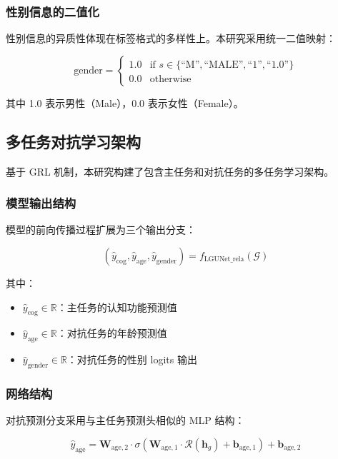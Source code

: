 \documentclass[UTF8, a4paper, 12pt]{article}
\begin{document}
\subsubsection{性别信息的二值化}

性别信息的异质性体现在标签格式的多样性上。本研究采用统一二值映射：

\begin{equation}
\text{gender} = \begin{cases}
1.0 & \text{if } s \in \{ \text{``M''}, \text{``MALE''}, \text{``1''}, \text{``1.0''} \} \\
0.0 & \text{otherwise}
\end{cases}
\end{equation}

其中 1.0 表示男性（Male），0.0 表示女性（Female）。

\subsection{多任务对抗学习架构}

基于 GRL 机制，本研究构建了包含主任务和对抗任务的多任务学习架构。

\subsubsection{模型输出结构}

模型的前向传播过程扩展为三个输出分支：

\begin{equation}
(\hat{y}_{\text{cog}}, \hat{y}_{\text{age}}, \hat{y}_{\text{gender}}) = f_{\text{LGUNet\_rela}}(\mathcal{G})
\end{equation}

其中：
\begin{itemize}
    \item $\hat{y}_{\text{cog}} \in \mathbb{R}$：主任务的认知功能预测值
    \item $\hat{y}_{\text{age}} \in \mathbb{R}$：对抗任务的年龄预测值
    \item $\hat{y}_{\text{gender}} \in \mathbb{R}$：对抗任务的性别 logits 输出
\end{itemize}

\subsubsection{网络结构}

对抗预测分支采用与主任务预测头相似的 MLP 结构：

\begin{equation}
\hat{y}_{\text{age}} = \mathbf{W}_{\text{age},2} \cdot \sigma\left( \mathbf{W}_{\text{age},1} \cdot \mathcal{R}(\mathbf{h}_g) + \mathbf{b}_{\text{age},1} \right) + \mathbf{b}_{\text{age},2}
\end{equation}
\end{document}
